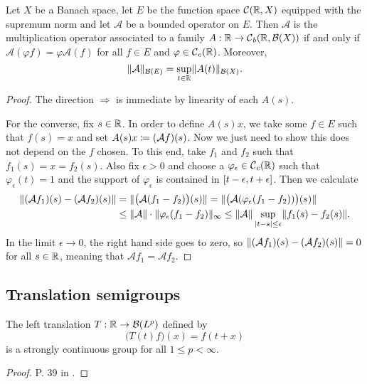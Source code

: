 \begin{proposition}
Let $X$ be a Banach space, let $E$ be the function space $\operatorname{\mathcal{C}}(\mathbb{R},X)$ equipped with the supremum norm and let $\mathcal{A}$ be a bounded operator on $E$. Then $\mathcal{A}$ is the multiplication operator associated to a family $A: \mathbb{R}\to \operatorname{\mathcal{C}}_b(\mathbb{R}, \operatorname{\mathcal{B}}(X))$ \textup{if and only if} $\mathcal{A}(\varphi f) = \varphi\mathcal{A}(f)$ for all $f\in E$ and $\varphi\in\operatorname{\mathcal{C}}_c(\mathbb{R})$. Moreover,
\[ \lVert\mathcal{A}\rVert_{\operatorname{\mathcal{B}}(E)} = \sup_{t\in\mathbb{R}}\lVert A(t)\rVert_{\operatorname{\mathcal{B}}(X)}. \]
\end{proposition}
\begin{proof}
The direction $\Rightarrow$ is immediate by linearity of each $A(s)$.

For the converse, fix $s\in \mathbb{R}$. In order to define $A(s)x$, we take some $f\in E$ such that $f(s) = x$ and set $A(s)x \coloneqq (\mathcal{A}f)(s)$. Now we just need to show this does not depend on the $f$ chosen. To this end, take $f_1$ and $f_2$ such that $f_1(s) = x = f_2(s)$. Also fix $\epsilon >0$ and choose a $\varphi_\epsilon\in\operatorname{\mathcal{C}}_c(\mathbb{R})$ such that $\varphi_\epsilon(t) = 1$ and the support of $\varphi_\epsilon$ is contained in $\interval{t-\epsilon, t+\epsilon}$. Then we calculate
\begin{align*}
\lVert(\mathcal{A}f_1)(s) - (\mathcal{A}f_2)(s)\rVert &= \lVert\big(\mathcal{A}(f_1 - f_2)\big)(s)\rVert = \lVert\big(\mathcal{A}(\varphi_\epsilon (f_1 - f_2))\big)(s)\rVert \\
&\leq \lVert\mathcal{A}\rVert\cdot\lVert\varphi_\epsilon (f_1-f_2)\rVert_\infty \leq \lVert\mathcal{A}\rVert \sup_{|t-s|\leq \epsilon}\lVert f_1(s)-f_2(s)\rVert.
\end{align*}
In the limit $\epsilon\to 0$, the right hand side goes to zero, so $\lVert(\mathcal{A}f_1)(s) - (\mathcal{A}f_2)(s)\rVert = 0$ for all $s\in \mathbb{R}$, meaning that $\mathcal{A}f_1 = \mathcal{A}f_2$.
\end{proof}

\subsection{Translation semigroups}
\begin{proposition}
The left translation $T:\mathbb{R} \to \operatorname{\mathcal{B}}(L^p)$ defined by
\[ \big(T(t)f\big)(x) = f(t+x) \]
is a strongly continuous group for all $1\leq p < \infty$.
\end{proposition}
\begin{proof}
P. 39 in \cite{engel_one-parameter_2000}.
\end{proof}

